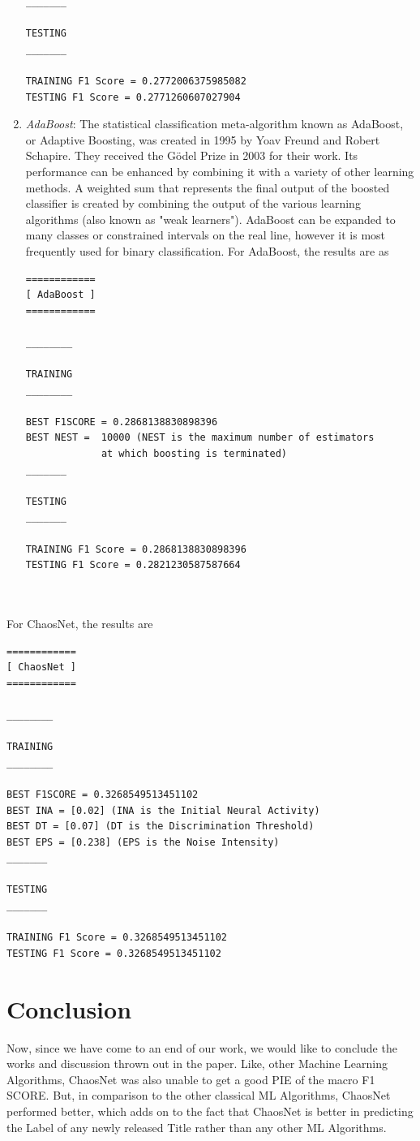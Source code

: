 \documentclass[runningheads]{llncs}
\begin{document}
\begin{enumerate}
\begin{verbatim}
_______

TESTING
_______

TRAINING F1 Score = 0.2772006375985082
TESTING F1 Score = 0.2771260607027904

\end{verbatim}
\item \textit{AdaBoost}: The statistical classification meta-algorithm known as AdaBoost, or Adaptive Boosting, was created in 1995 by Yoav Freund and Robert Schapire. They received the Gödel Prize in 2003 for their work. Its performance can be enhanced by combining it with a variety of other learning methods. A weighted sum that represents the final output of the boosted classifier is created by combining the output of the various learning algorithms (also known as "weak learners"). AdaBoost can be expanded to many classes or constrained intervals on the real line, however it is most frequently used for binary classification. For AdaBoost, the results are as
\begin{verbatim}
============
[ AdaBoost ]
============

________

TRAINING
________

BEST F1SCORE = 0.2868138830898396
BEST NEST =  10000 (NEST is the maximum number of estimators 
             at which boosting is terminated)
_______

TESTING
_______

TRAINING F1 Score = 0.2868138830898396
TESTING F1 Score = 0.2821230587587664

\end{verbatim}
\end{enumerate}
\textbf{\\\\}
For ChaosNet, the results are

\begin{verbatim}
============
[ ChaosNet ]
============

________

TRAINING
________

BEST F1SCORE = 0.3268549513451102
BEST INA = [0.02] (INA is the Initial Neural Activity)
BEST DT = [0.07] (DT is the Discrimination Threshold)
BEST EPS = [0.238] (EPS is the Noise Intensity)
_______

TESTING
_______

TRAINING F1 Score = 0.3268549513451102
TESTING F1 Score = 0.3268549513451102

\end{verbatim}
\section{Conclusion}
Now, since we have come to an end of our work, we would like to conclude the works and discussion thrown out in the paper. Like, other Machine Learning Algorithms, ChaosNet was also unable to get a good PIE of the macro F1 SCORE. But, in comparison to the other classical ML Algorithms, ChaosNet performed better, which adds on to the fact that ChaosNet is better in predicting the Label of any newly released Title rather than any other ML Algorithms. \\
\end{document}
